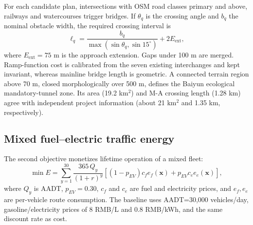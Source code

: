 \documentclass[preprint,12pt]{elsarticle}
\begin{document}
For each candidate plan, intersections with OSM road classes primary and above, railways and watercourses trigger bridges. If $\theta_q$ is the crossing angle and $b_q$ the nominal obstacle width, the required crossing interval is
\begin{equation}
\ell_q=\frac{b_q}{\max(\sin\theta_q,\sin15^\circ)}+2E_{\mathrm{ext}},
\end{equation}
where $E_{\mathrm{ext}}=75$ m is the approach extension. Gaps under 100 m are merged. Ramp-function cost is calibrated from the seven existing interchanges and kept invariant, whereas mainline bridge length is geometric. A connected terrain region above 70 m, closed morphologically over 500 m, defines the Baiyun ecological mandatory-tunnel zone. Its area (19.2 km$^2$) and M-A crossing length (1.28 km) agree with independent project information (about 21 km$^2$ and 1.35 km, respectively).

\begin{table}[t]
\centering
\caption{Principal current-model parameters used in the case study.}
\label{tab:parameters}
\end{table}

\subsection{Mixed fuel--electric traffic energy}

The second objective monetizes lifetime operation of a mixed fleet:
\begin{equation}
\min E=\sum_{y=1}^{30}\frac{365\,Q_y}{(1+r)^y}
\left[(1-p_{EV})c_f e_f(\bm x)+p_{EV}c_e e_e(\bm x)\right],
\label{eq:energy}
\end{equation}
where $Q_y$ is AADT, $p_{EV}=0.30$, $c_f$ and $c_e$ are fuel and electricity prices, and $e_f,e_e$ are per-vehicle route consumption. The baseline uses AADT=30,000 vehicles/day, gasoline/electricity prices of 8 RMB/L and 0.8 RMB/kWh, and the same discount rate as cost.
\end{document}
